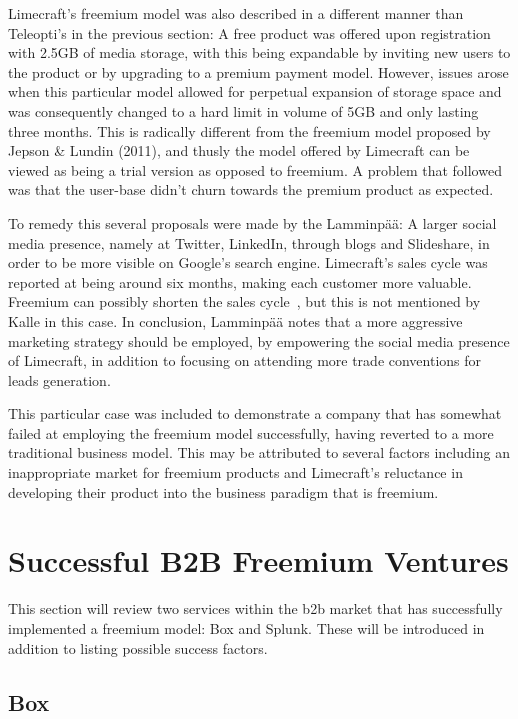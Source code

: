 Limecraft's freemium model was also described in a different manner than Teleopti's in the previous section: A free product was offered upon registration with 2.5GB of media storage, with this being expandable by inviting new users to the product or by upgrading to a premium payment model. However, issues arose when this particular model allowed for perpetual expansion of storage space and was consequently changed to a hard limit in volume of 5GB and only lasting three months. This is radically different from the freemium model proposed by Jepson \& Lundin (2011), and thusly the model offered by Limecraft can be viewed as being a trial version as opposed to freemium. A problem that followed was that the user-base didn't churn towards the premium product as expected. 


To remedy this several proposals were made by the Lamminpää: A larger social media presence, namely at Twitter, LinkedIn, through blogs and Slideshare, in order to be more visible on Google's search engine. Limecraft's sales cycle was reported at being around six months, making each customer more valuable. Freemium can possibly shorten the sales cycle~\cite{davidskokN/A}, but this is not mentioned by Kalle in this case. In conclusion, Lamminpää notes that a more aggressive marketing strategy should be employed, by empowering the social media presence of Limecraft, in addition to focusing on attending more trade conventions for leads generation. 


This particular case was included to demonstrate a company that has somewhat failed at employing the freemium model successfully, having reverted to a more traditional business model. This may be attributed to several factors including an inappropriate market for freemium products and Limecraft's reluctance in developing their product into the business paradigm that is freemium. 

\section{Successful B2B Freemium Ventures}
This section will review two services within the \gls{b2b} market that has successfully implemented a freemium model: Box and Splunk. These will be introduced in addition to listing possible success factors.
\subsection{Box}
